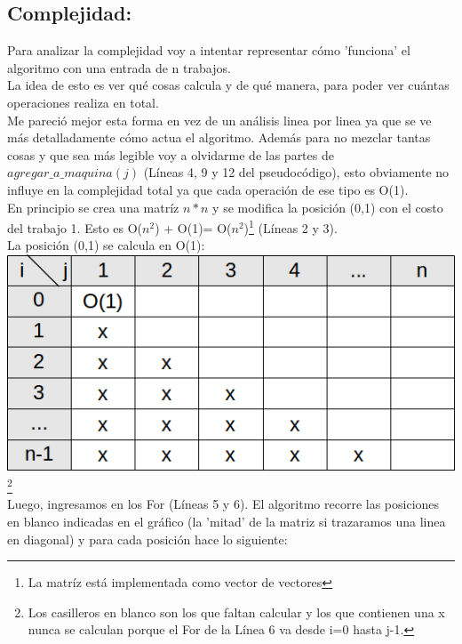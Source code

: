 \subsection{Complejidad:}

Para analizar la complejidad voy a intentar representar cómo 'funciona' el algoritmo con una entrada de n trabajos.\\
La idea de esto es ver qué cosas calcula y de qué manera, para poder ver cuántas operaciones realiza en total.\\

Me pareció mejor esta forma en vez de un análisis linea por linea ya que se ve más detalladamente cómo actua el algoritmo. 
Además para no mezclar tantas cosas y que sea más legible voy a olvidarme de las partes de $agregar\_a\_maquina(j)$ (Líneas 4, 9 y 12 del pseudocódigo), esto obviamente no influye en la complejidad total ya que cada operación de ese tipo es O(1).\\

En principio se crea una matríz $n*n$ y se modifica la posición (0,1) con el costo del trabajo 1. Esto es O($n^{2}$) + O(1)= O($n^{2}$)\footnote{La matríz está implementada como vector de vectores}  (Líneas 2 y 3).\\

La posición (0,1) se calcula en O(1):\\

\includegraphics[scale=0.7]{ej1/complejidad1.png}\footnote{Los casilleros en blanco son los que faltan calcular y los que contienen una x nunca se calculan porque el For de la Línea 6 va desde i=0 hasta j-1.} \\

Luego, ingresamos en los For (Líneas 5 y 6). El algoritmo recorre las posiciones en blanco indicadas en el gráfico (la 'mitad' de la matriz si trazaramos una linea en diagonal) y para cada posición hace lo siguiente:\\

